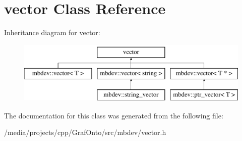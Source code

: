 \hypertarget{classstd_1_1vector}{\section{vector \-Class \-Reference}
\label{classstd_1_1vector}
}
\-Inheritance diagram for vector\-:\begin{figure}[H]
\begin{center}
\leavevmode
\includegraphics[height=3.000000cm]{classstd_1_1vector}
\end{center}
\end{figure}


\-The documentation for this class was generated from the following file\-:\begin{DoxyCompactItemize}
\item 
/media/projects/cpp/\-Graf\-Onto/src/mbdev/vector.\-h\end{DoxyCompactItemize}
